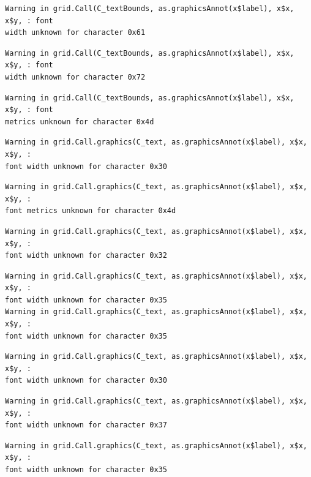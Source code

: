 \documentclass[
  letterpaper,
]{scrbook}
\begin{document}
\begin{verbatim}
Warning in grid.Call(C_textBounds, as.graphicsAnnot(x$label), x$x, x$y, : font
width unknown for character 0x61
\end{verbatim}

\begin{verbatim}
Warning in grid.Call(C_textBounds, as.graphicsAnnot(x$label), x$x, x$y, : font
width unknown for character 0x72
\end{verbatim}

\begin{verbatim}
Warning in grid.Call(C_textBounds, as.graphicsAnnot(x$label), x$x, x$y, : font
metrics unknown for character 0x4d
\end{verbatim}

\begin{verbatim}
Warning in grid.Call.graphics(C_text, as.graphicsAnnot(x$label), x$x, x$y, :
font width unknown for character 0x30
\end{verbatim}

\begin{verbatim}
Warning in grid.Call.graphics(C_text, as.graphicsAnnot(x$label), x$x, x$y, :
font metrics unknown for character 0x4d
\end{verbatim}

\begin{verbatim}
Warning in grid.Call.graphics(C_text, as.graphicsAnnot(x$label), x$x, x$y, :
font width unknown for character 0x32
\end{verbatim}

\begin{verbatim}
Warning in grid.Call.graphics(C_text, as.graphicsAnnot(x$label), x$x, x$y, :
font width unknown for character 0x35
Warning in grid.Call.graphics(C_text, as.graphicsAnnot(x$label), x$x, x$y, :
font width unknown for character 0x35
\end{verbatim}

\begin{verbatim}
Warning in grid.Call.graphics(C_text, as.graphicsAnnot(x$label), x$x, x$y, :
font width unknown for character 0x30
\end{verbatim}

\begin{verbatim}
Warning in grid.Call.graphics(C_text, as.graphicsAnnot(x$label), x$x, x$y, :
font width unknown for character 0x37
\end{verbatim}

\begin{verbatim}
Warning in grid.Call.graphics(C_text, as.graphicsAnnot(x$label), x$x, x$y, :
font width unknown for character 0x35
\end{verbatim}
\end{document}
